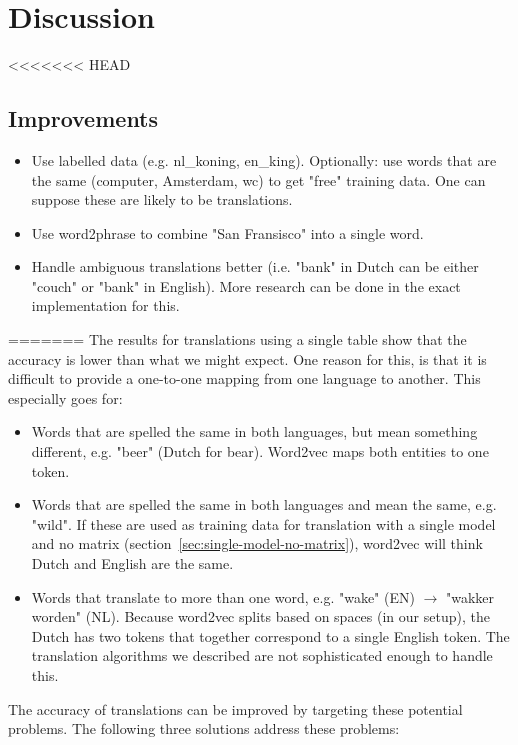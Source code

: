 \section{Discussion}
\label{sec:discussion}
<<<<<<< HEAD

\subsection{Improvements}
\begin{itemize}
\item Use labelled data (e.g. nl\_koning, en\_king). Optionally: use words that are the same (computer, Amsterdam, wc) to get "free" training data. One can suppose these are likely to be translations.
\item Use word2phrase to combine "San Fransisco" into a single word.
\item Handle ambiguous translations better (i.e. "bank" in Dutch can be either "couch" or "bank" in English). More research can be done in the exact implementation for this.
\end{itemize}
=======
The results for translations using a single table show that the accuracy is lower than what we might expect. One reason for this, is that it is difficult to provide a one-to-one mapping from one language to another. This especially goes for:
\begin{itemize}
\item Words that are spelled the same in both languages, but mean something different, e.g. "beer" (Dutch for bear). Word2vec maps both entities to one token.
\item Words that are spelled the same in both languages and mean the same, e.g. "wild". If these are used as training data for translation with a single model and no matrix (section~\ref{sec:single-model-no-matrix}), word2vec will think Dutch and English are the same.
\item Words that translate to more than one word, e.g. "wake" (EN) $\to$ "wakker worden" (NL). Because word2vec splits based on spaces (in our setup), the Dutch has two tokens that together correspond to a single English token. The translation algorithms we described are not sophisticated enough to handle this.
\end{itemize}

The accuracy of translations can be improved by targeting these potential problems. The following three solutions address these problems:

